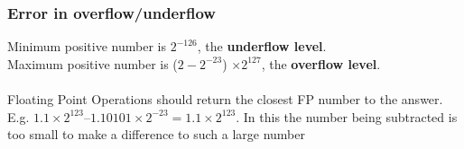 \documentclass{article}[18pt]
\begin{document}
\subsubsection{Error in overflow/underflow}
Minimum positive number is $2^{-126}$, the \textbf{underflow level}.\\
Maximum positive number is ($2-2^{-23}$) $\times 2^{127}$, the \textbf{overflow level}.\\
\\
Floating Point Operations should return the closest FP number to the answer. E.g. $1.1\times2^{123} – 1.10101\times2^{-23} = 1.1\times2^{123}$. In this the number being subtracted is too small to make a difference to such a large number
\end{document}
